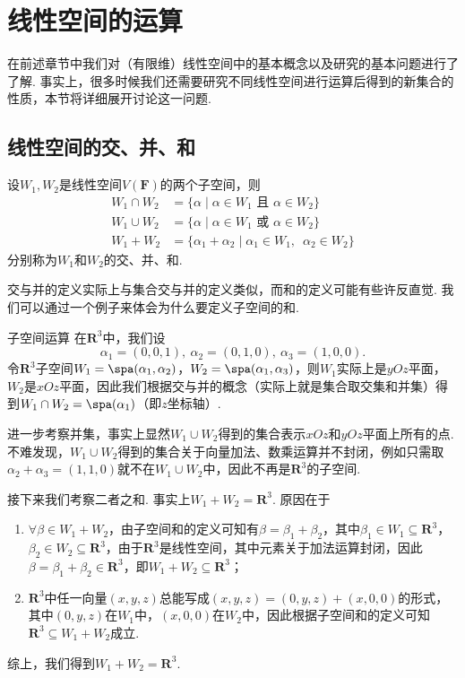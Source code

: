 \chapter{线性空间的运算}

在前述章节中我们对（有限维）线性空间中的基本概念以及研究的基本问题进行了了解. 事实上，很多时候我们还需要研究不同线性空间进行运算后得到的新集合的性质，本节将详细展开讨论这一问题.

\section{线性空间的交、并、和}

\begin{definition}{}{}
    设$W_1,W_2$是线性空间$V(\mathbf{F})$的两个子空间，则
    \begin{align*}
        W_1 \cap W_2 & =\{\alpha \mid \alpha\in W_1 \text{~且~} \alpha\in W_2\}            \\
        W_1 \cup W_2 & =\{\alpha \mid \alpha\in W_1 \text{~或~} \alpha\in W_2\}            \\
        W_1 + W_2    & =\{\alpha_1+\alpha_2 \mid \alpha_1\in W_1,\enspace\alpha_2\in W_2\}
    \end{align*}
    分别称为$W_1$和$W_2$的交、并、和.
\end{definition}

交与并的定义实际上与集合交与并的定义类似，而和的定义可能有些许反直觉. 我们可以通过一个例子来体会为什么要定义子空间的和.
\begin{example}{}{子空间运算}
    在$\mathbf{R}^3$中，我们设
    \[\alpha_1=(0,0,1),\ \alpha_2=(0,1,0),\ \alpha_3=(1,0,0).\]
    令$\mathbf{R}^3$子空间$W_1=\spa(\alpha_1,\alpha_2)$，$W_2=\spa(\alpha_1,\alpha_3)$，则$W_1$实际上是$yOz$平面，$W_2$是$xOz$平面，因此我们根据交与并的概念（实际上就是集合取交集和并集）得到$W_1 \cap W_2=\spa(\alpha_1)$（即$z$坐标轴）.

    进一步考察并集，事实上显然$W_1 \cup W_2$得到的集合表示$xOz$和$yOz$平面上所有的点. 不难发现，$W_1 \cup W_2$得到的集合关于向量加法、数乘运算并不封闭，例如只需取$\alpha_2+\alpha_3=(1,1,0)$就不在$W_1 \cup W_2$中，因此不再是$\mathbf{R}^3$的子空间.

    接下来我们考察二者之和. 事实上$W_1+W_2=\mathbf{R}^3$. 原因在于
    \begin{enumerate}
        \item $\forall \beta\in W_1 + W_2$，由子空间和的定义可知有$\beta=\beta_1+\beta_2$，其中$\beta_1\in W_1\subseteq \mathbf{R}^3$，$\beta_2\in W_2\subseteq \mathbf{R}^3$，由于$\mathbf{R}^3$是线性空间，其中元素关于加法运算封闭，因此$\beta=\beta_1+\beta_2\in \mathbf{R}^3$，即$W_1+W_2\subseteq \mathbf{R}^3$；

        \item $\mathbf{R}^3$中任一向量$(x,y,z)$总能写成$(x,y,z)=(0,y,z)+(x,0,0)$的形式，其中$(0,y,z)$在$W_1$中，$(x,0,0)$在$W_2$中，因此根据子空间和的定义可知$\mathbf{R}^3\subseteq W_1 + W_2$成立.
    \end{enumerate}
    综上，我们得到$W_1+W_2=\mathbf{R}^3$.
\end{example}

